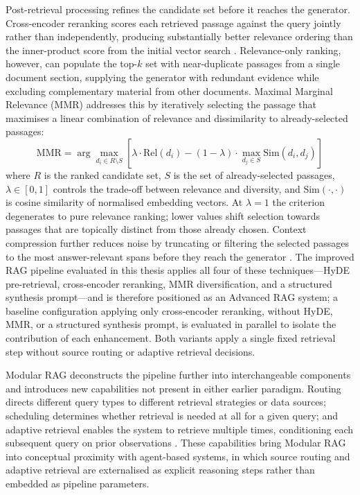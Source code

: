 Post-retrieval processing refines the candidate set before it reaches the generator. Cross-encoder reranking scores each retrieved passage against the query jointly rather than independently, producing substantially better relevance ordering than the inner-product score from the initial vector search \cite{gao2023ragsurvey}. Relevance-only ranking, however, can populate the top-$k$ set with near-duplicate passages from a single document section, supplying the generator with redundant evidence while excluding complementary material from other documents. Maximal Marginal Relevance (MMR) \cite{carbonell1998mmr} addresses this by iteratively selecting the passage that maximises a linear combination of relevance and dissimilarity to already-selected passages:
\begin{equation}
  \text{MMR} = \arg\max_{d_i \in R \setminus S} \left[ \lambda \cdot \text{Rel}(d_i) - (1-\lambda) \cdot \max_{d_j \in S} \text{Sim}(d_i, d_j) \right]
\end{equation}
where $R$ is the ranked candidate set, $S$ is the set of already-selected passages, $\lambda \in [0,1]$ controls the trade-off between relevance and diversity, and $\text{Sim}(\cdot,\cdot)$ is cosine similarity of normalised embedding vectors. At $\lambda = 1$ the criterion degenerates to pure relevance ranking; lower values shift selection towards passages that are topically distinct from those already chosen. Context compression further reduces noise by truncating or filtering the selected passages to the most answer-relevant spans before they reach the generator \cite{gao2023ragsurvey}. The improved RAG pipeline evaluated in this thesis applies all four of these techniques—HyDE pre-retrieval, cross-encoder reranking, MMR diversification, and a structured synthesis prompt—and is therefore positioned as an Advanced RAG system; a baseline configuration applying only cross-encoder reranking, without HyDE, MMR, or a structured synthesis prompt, is evaluated in parallel to isolate the contribution of each enhancement. Both variants apply a single fixed retrieval step without source routing or adaptive retrieval decisions.

Modular RAG deconstructs the pipeline further into interchangeable components and introduces new capabilities not present in either earlier paradigm. Routing directs different query types to different retrieval strategies or data sources; scheduling determines whether retrieval is needed at all for a given query; and adaptive retrieval enables the system to retrieve multiple times, conditioning each subsequent query on prior observations \cite{gao2023ragsurvey}. These capabilities bring Modular RAG into conceptual proximity with agent-based systems, in which source routing and adaptive retrieval are externalised as explicit reasoning steps rather than embedded as pipeline parameters.

